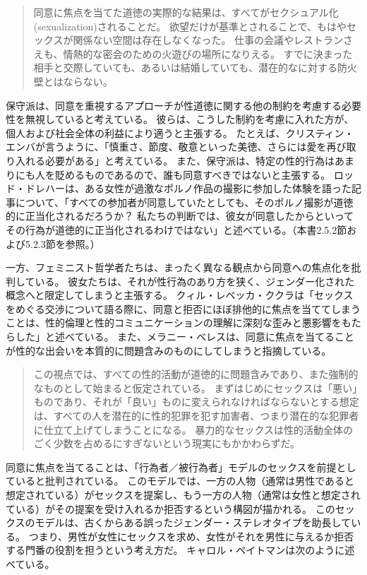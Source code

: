 \documentclass[paper=a4,book,openany]{jlreq} \usepackage{mystyle}
\begin{document}
\begin{quote}
同意に焦点を当てた道徳の実際的な結果は、すべてがセクシュアル化(sexualization)されることだ。
欲望だけが基準とされることで、もはやセックスが関係ない空間は存在しなくなった。
仕事の会議やレストランさえも、情熱的な密会のための火遊びの場所になりえる。
すでに決まった相手と交際していても、あるいは結婚していても、潜在的なに対する防火壁とはならない。
\citep{french17:_its_past_time}
\end{quote}

保守派は、同意を重視するアプローチが性道徳に関する他の制約を考慮する必要性を無視していると考えている。
彼らは、こうした制約を考慮に入れた方が、個人および社会全体の利益により適うと主張する。
たとえば、クリスティン・エンバが言うように、「慎重さ、節度、敬意といった美徳、さらには愛を再び取り入れる必要がある」と考えている\citep{emba17:_lets_rethin_sex}。
また、保守派は、特定の性的行為はあまりにも人を貶めるものであるので、誰も同意すべきではないと主張する。
ロッド・ドレハーは、ある女性が過激なポルノ作品の撮影に参加した体験を語った記事について、「すべての参加者が同意していたとしても、そのポルノ撮影が道徳的に正当化されるだろうか？ 私たちの判断では、彼女が同意したからといってその行為が道徳的に正当化されるわけではない」と述べている\citep{dreher13:_porn_cultur_consen}。（本書2.5.2節および5.2.3節を参照。）

一方、フェミニスト哲学者たちは、まったく異なる観点から同意への焦点化を批判している。
彼女たちは、それが性行為のあり方を狭く、ジェンダー化された概念へと限定してしまうと主張する。
クィル・レベッカ・ククラは「セックスをめぐる交渉について語る際に、同意と拒否にほぼ排他的に焦点を当ててしまうことは、性的倫理と性的コミュニケーションの理解に深刻な歪みと悪影響をもたらした」と述べている\citep[p.75]{kukla18:_thats_what_she_said}。
また、メラニー・ベレスは、同意に焦点を当てることが性的な出会いを本質的に問題含みのものにしてしまうと指摘している。

\begin{quote}
この視点では、すべての性的活動が道徳的に問題含みであり、また強制的なものとして始まると仮定されている。
まずはじめにセックスは「悪い」ものであり、それが「良い」ものに変えられなければならないとする想定は、すべての人を潜在的に性的犯罪を犯す加害者、つまり潜在的な犯罪者に仕立て上げてしまうことになる。
暴力的なセックスは性的活動全体のごく少数を占めるにすぎないという現実にもかかわらずだ。
\citep[p.102]{beres07:_spont_sexual_consen}
\end{quote}

同意に焦点を当てることは、「行為者／被行為者」モデルのセックスを前提としていると批判されている。
このモデルでは、一方の人物（通常は男性であると想定されている）がセックスを提案し、もう一方の人物（通常は女性と想定されている）がその提案を受け入れるか拒否するという構図が描かれる。
このセックスのモデルは、古くからある誤ったジェンダー・ステレオタイプを助長している。
つまり、男性が女性にセックスを求め、女性がそれを男性に与えるか拒否する門番の役割を担うという考え方だ。
キャロル・ペイトマンは次のように述べている。
\end{document}
